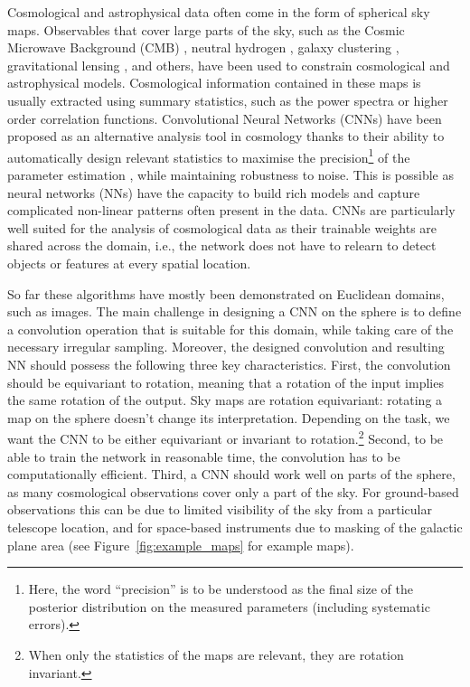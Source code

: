 \documentclass[final,twocolumn,3p,times,sort&compress]{elsarticle}
\newcommand{\figref}[1]{Figure~\ref{fig:#1}}
\newcommand{\1}{\b{1}}              %
\newcommand{\0}{\b{0}}              %
\begin{document}
Cosmological and astrophysical data often come in the form of spherical sky maps.
Observables that cover large parts of the sky, such as the Cosmic Microwave Background (CMB) \citep{planck2015cosmologicalparameters,komatsu2011sevenyear,staggs2018recentdiscoveries}, neutral hydrogen \citep{santos2015cosmologySKA,HI4PI2016fullskyHI}, galaxy clustering \citep{alam2017clusteringgalaxies}, gravitational lensing \citep{troxel2017darkenergy,hildebrandt2017kidscosmological}, and others, have been used to constrain cosmological and astrophysical models.
Cosmological information contained in these maps is usually extracted using summary statistics, such as the power spectra or higher order correlation functions.
Convolutional Neural Networks (CNNs) have been proposed as an alternative analysis tool in cosmology thanks to their ability to automatically design relevant statistics to maximise the precision\footnote{Here, the word ``precision'' is to be understood as the final size of the posterior distribution on the measured parameters (including systematic errors).} of the parameter estimation
\citep{schmelze2017cosmologicalmodel,luciesmith2018machinelearning,gupta2018nongaussianinformation,gillet2018deeplearning,hassan2018reionizationmodels,aragoncalvo2018classyfyinglarge,ciuca2017cnnstring,ravanbakhsh2017estimating}, while maintaining robustness to noise.
This is possible as neural networks (NNs) have the capacity to build rich models and capture complicated non-linear patterns often present in the data.
CNNs are particularly well suited for the analysis of cosmological data as their trainable weights are shared across the domain, i.e., the network does not have to relearn to detect objects or features at every spatial location.


So far these algorithms have mostly been demonstrated on Euclidean domains, such as images.
The main challenge in designing a CNN on the sphere is to define a convolution operation that is suitable for this domain, while taking care of the necessary irregular sampling.
Moreover, the designed convolution and resulting NN should possess the following three key characteristics.
First, the convolution should be equivariant to rotation, meaning that a rotation of the input implies the same rotation of the output.
Sky maps are rotation equivariant: rotating a map on the sphere doesn’t change its interpretation.
Depending on the task, we want the CNN to be either equivariant or invariant to rotation.\footnote{When only the statistics of the maps are relevant, they are rotation invariant.}
Second, to be able to train the network in reasonable time, the convolution has to be computationally efficient.
Third, a CNN should work well on parts of the sphere, as many cosmological observations cover only a part of the sky.
For ground-based observations this can be due to limited visibility of the sky from a particular telescope location, and for space-based instruments due to masking of the galactic plane area (see \figref{example_maps} for example maps).
\end{document}
